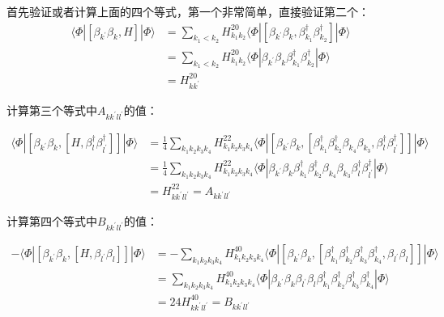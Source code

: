 \begin{booknote*}
首先验证或者计算上面的四个等式，第一个非常简单，直接验证第二个：
\begin{align*}
\langle\Phi|[\beta_{k^{\prime}}\beta_{k},H]|\Phi\rangle & =\sum_{k_{1}<k_{2}}H^{20}_{k_{1}k_{2}}\langle\Phi|[\beta_{k^{\prime}}\beta_{k},\beta^{\dagger}_{k_{1}}\beta^{\dagger}_{k_{2}}]|\Phi\rangle\\
 & =\sum_{k_{1}<k_{2}}H^{20}_{k_{1}k_{2}}\langle\Phi|\beta_{k^{\prime}}\beta_{k}\beta^{\dagger}_{k_{1}}\beta^{\dagger}_{k_{2}}|\Phi\rangle\\
 & =H^{20}_{kk^{\prime}}
\end{align*}

计算第三个等式中$A_{kk^{\prime}ll^{\prime}}$的值：

\begin{align*}
\langle\Phi|[\beta_{k^{\prime}}\beta_{k},[H,\beta^{\dagger}_{l}\beta^{\dagger}_{l^{\prime}}]]|\Phi\rangle & =\frac{1}{4}\sum_{k_{1}k_{2}k_{3}k_{4}}H^{22}_{k_{1}k_{2}k_{3}k_{4}}\langle\Phi|[\beta_{k^{\prime}}\beta_{k},[\beta^{\dagger}_{k_{1}}\beta^{\dagger}_{k_{2}}\beta_{k_{4}}\beta_{k_{3}},\beta^{\dagger}_{l}\beta^{\dagger}_{l^{\prime}}]]|\Phi\rangle\\
 & =\frac{1}{4}\sum_{k_{1}k_{2}k_{3}k_{4}}H^{22}_{k_{1}k_{2}k_{3}k_{4}}\langle\Phi|\beta_{k^{\prime}}\beta_{k}\beta^{\dagger}_{k_{1}}\beta^{\dagger}_{k_{2}}\beta_{k_{4}}\beta_{k_{3}}\beta^{\dagger}_{l}\beta^{\dagger}_{l^{\prime}}|\Phi\rangle\\
 & =H^{22}_{kk^{\prime}ll^{\prime}}=A_{kk^{\prime}ll^{\prime}}
\end{align*}

计算第四个等式中$B_{kk^{\prime}ll^{\prime}}$的值：

\begin{align*}
-\langle\Phi|[\beta_{k^{\prime}}\beta_{k},[H,\beta_{l^{\prime}}\beta_{l}]]|\Phi\rangle & =-\sum_{k_{1}k_{2}k_{3}k_{4}}H^{40}_{k_{1}k_{2}k_{3}k_{4}}\langle\Phi|[\beta_{k^{\prime}}\beta_{k},[\beta^{\dagger}_{k_{1}}\beta^{\dagger}_{k_{2}}\beta^{\dagger}_{k_{3}}\beta^{\dagger}_{k_{4}},\beta_{l^{\prime}}\beta_{l}]]|\Phi\rangle\\
 & =\sum_{k_{1}k_{2}k_{3}k_{4}}H^{40}_{k_{1}k_{2}k_{3}k_{4}}\langle\Phi|\beta_{k^{\prime}}\beta_{k}\beta_{l^{\prime}}\beta_{l}\beta^{\dagger}_{k_{1}}\beta^{\dagger}_{k_{2}}\beta^{\dagger}_{k_{3}}\beta^{\dagger}_{k_{4}}|\Phi\rangle\\
 & =24H^{40}_{kk^{\prime}ll^{\prime}}=B_{kk^{\prime}ll^{\prime}}
\end{align*}


\end{booknote*}
